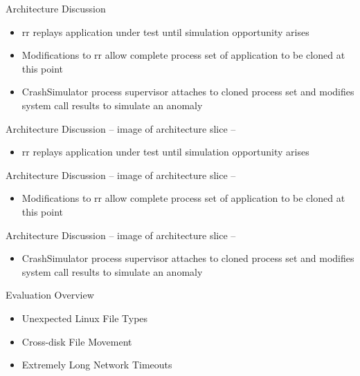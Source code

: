 \documentclass[pdf]{beamer}
\begin{document}
\begin{frame}{Architecture Discussion}
  \begin{itemize}
    \item{rr replays application under test until simulation opportunity
      arises}
    \item{Modifications to rr allow complete process set of application to
      be cloned at this point}
    \item{CrashSimulator process supervisor attaches to cloned process set
      and modifies system call results to simulate an anomaly}
  \end{itemize}
\end{frame}


\begin{frame}{Architecture Discussion}
  -- image of architecture slice --
  \begin{itemize}
    \item{rr replays application under test until simulation opportunity
      arises}
  \end{itemize}
\end{frame}


\begin{frame}{Architecture Discussion}
  -- image of architecture slice --
  \begin{itemize}
    \item{Modifications to rr allow complete process set of application to
      be cloned at this point}
  \end{itemize}
\end{frame}


\begin{frame}{Architecture Discussion}
  -- image of architecture slice --
  \begin{itemize}
    \item{CrashSimulator process supervisor attaches to cloned process set
      and modifies system call results to simulate an anomaly}
  \end{itemize}
\end{frame}


\begin{frame}{Evaluation Overview}
  \begin{itemize}
    \item{Unexpected Linux File Types}
    \item{Cross-disk File Movement}
    \item{Extremely Long Network Timeouts}
  \end{itemize}
\end{frame}
\end{document}
